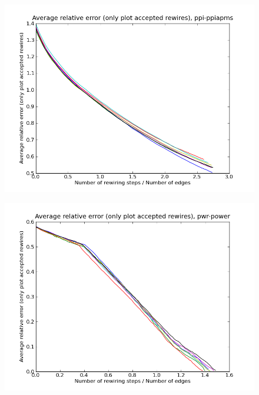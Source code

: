 \documentclass[12pt]{article}
\begin{document}
\begin{figure}[p]
\includegraphics[scale=0.75]{acceptedOnly-ppi-ppiapms.png}\\
\end{figure}


\begin{figure}[p]
\includegraphics[scale=0.75]{acceptedOnly-pwr-power.png}\\
\end{figure}
\end{document}
